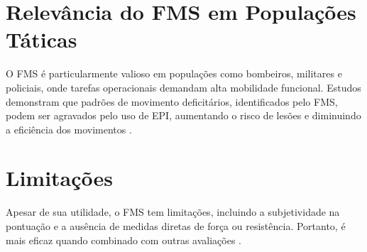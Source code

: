 \section{Relevância do \acrshort{FMS} em Populações Táticas}
O \acrshort{FMS} é particularmente valioso em populações como bombeiros, militares e policiais, onde tarefas operacionais demandam alta mobilidade funcional.
 Estudos demonstram que padrões de movimento deficitários, identificados pelo \acrshort{FMS}, podem ser agravados pelo uso de \acrshort{EPI}, aumentando o risco
  de lesões e diminuindo a eficiência dos movimentos \cite{orr2019impact}. 

\section{Limitações}
Apesar de sua utilidade, o \acrshort{FMS} tem limitações, incluindo a subjetividade na pontuação e a ausência de medidas diretas de força ou resistência.
 Portanto, é mais eficaz quando combinado com outras avaliações \cite{gribble2013intrarater}.